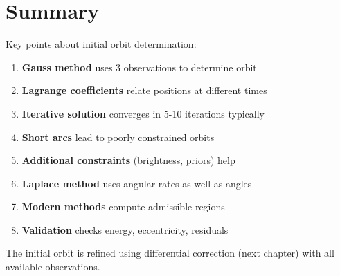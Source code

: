 \section{Summary}

Key points about initial orbit determination:

\begin{enumerate}
    \item \textbf{Gauss method} uses 3 observations to determine orbit
    \item \textbf{Lagrange coefficients} relate positions at different times
    \item \textbf{Iterative solution} converges in 5-10 iterations typically
    \item \textbf{Short arcs} lead to poorly constrained orbits
    \item \textbf{Additional constraints} (brightness, priors) help
    \item \textbf{Laplace method} uses angular rates as well as angles
    \item \textbf{Modern methods} compute admissible regions
    \item \textbf{Validation} checks energy, eccentricity, residuals
\end{enumerate}

The initial orbit is refined using differential correction (next chapter) with all available observations.
